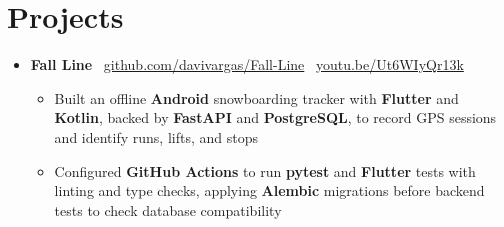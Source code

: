\documentclass[letterpaper,11pt]{article}
\newcommand{\resumeItem}[1]{
  \item\small{
    {#1 \vspace{-2pt}}
  }
}
\newcommand{\resumeSubHeadingListStart}{\begin{itemize}[leftmargin=0.15in, label={}]}
\newcommand{\resumeSubHeadingListEnd}{\end{itemize}}
\newcommand{\resumeItemListStart}{\begin{itemize}}
\newcommand{\resumeItemListEnd}{\end{itemize}\vspace{-5pt}}
\begin{document}
\section{Projects}
    \resumeSubHeadingListStart
      \item
        \textbf{Fall Line} \textbar\
        \href{https://github.com/davivargas/Fall-Line}{github.com/davivargas/Fall-Line}
        \textbar\
        \href{https://www.youtube.com/watch?v=Ut6WIyQr13k}{youtu.be/Ut6WIyQr13k}
        \vspace{-4pt}
        \resumeItemListStart
          \resumeItem{Built an offline \textbf{Android} snowboarding tracker with \textbf{Flutter} and \textbf{Kotlin}, backed by \textbf{FastAPI} and \textbf{PostgreSQL}, to record GPS sessions and identify runs, lifts, and stops}
          \resumeItem{Configured \textbf{GitHub Actions} to run \textbf{pytest} and \textbf{Flutter} tests with linting and type checks, applying \textbf{Alembic} migrations before backend tests to check database compatibility}
      \resumeItemListEnd
    \resumeSubHeadingListEnd
\end{document}
